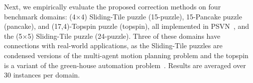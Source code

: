 \documentclass{article}
\begin{document}

Next, we empirically evaluate the proposed correction methods %
on four benchmark domains:
(4$\times$4) Sliding-Tile puzzle (15-puzzle), 15-Pancake puzzle (pancake), and (17,4)-Topspin puzzle (topspin), all implemented in PSVN~\cite{psvn}, and the (5$\times$5) Sliding-Tile puzzle (24-puzzle). %
Three of these domains have connections with real-world applications, as the Sliding-Tile puzzles are condensed versions of the multi-agent motion planning problem and the topspin is a variant of the green-house automation problem~\cite{HelmertL10}. %
Results are averaged over 30 instances per domain. 


\end{document}
